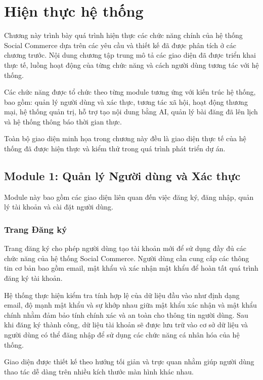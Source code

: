 \chapter{Hiện thực hệ thống}

Chương này trình bày quá trình hiện thực các chức năng chính của hệ thống Social Commerce dựa trên các yêu cầu và thiết kế đã được phân tích ở các chương trước. Nội dung chương tập trung mô tả các giao diện đã được triển khai thực tế, luồng hoạt động của từng chức năng và cách người dùng tương tác với hệ thống.

Các chức năng được tổ chức theo từng module tương ứng với kiến trúc hệ thống, bao gồm: quản lý người dùng và xác thực, tương tác xã hội, hoạt động thương mại, hệ thống quản trị, hỗ trợ tạo nội dung bằng AI, quản lý bài đăng đã lên lịch và hệ thống thông báo thời gian thực.

Toàn bộ giao diện minh họa trong chương này đều là giao diện thực tế của hệ thống đã được hiện thực và kiểm thử trong quá trình phát triển dự án.

\section{Module 1: Quản lý Người dùng và Xác thực}

Module này bao gồm các giao diện liên quan đến việc đăng ký, đăng nhập, quản lý tài khoản và cài đặt người dùng.

\subsection{Trang Đăng ký}

Trang đăng ký cho phép người dùng tạo tài khoản mới để sử dụng đầy đủ các chức năng của hệ thống Social Commerce. Người dùng cần cung cấp các thông tin cơ bản bao gồm email, mật khẩu và xác nhận mật khẩu để hoàn tất quá trình đăng ký tài khoản.

Hệ thống thực hiện kiểm tra tính hợp lệ của dữ liệu đầu vào như định dạng email, độ mạnh mật khẩu và sự khớp nhau giữa mật khẩu xác nhận và mật khẩu chính nhằm đảm bảo tính chính xác và an toàn cho thông tin người dùng. Sau khi đăng ký thành công, dữ liệu tài khoản sẽ được lưu trữ vào cơ sở dữ liệu và người dùng có thể đăng nhập để sử dụng các chức năng cá nhân hóa của hệ thống.

Giao diện được thiết kế theo hướng tối giản và trực quan nhằm giúp người dùng thao tác dễ dàng trên nhiều kích thước màn hình khác nhau.

